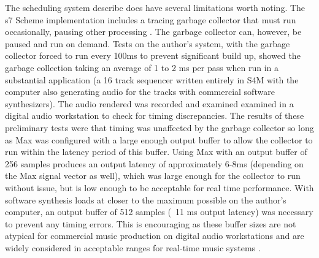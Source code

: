 \documentclass[acmsmall]{acmart}
\begin{document}
The scheduling system describe does have several limitations worth noting.
The s7 Scheme implementation includes a tracing garbage collector 
that must run occasionally, pausing other processing \cite{Matheussen2020}.
The garbage collector can, however, be paused and run on demand. Tests on the author's
system, with the garbage collector forced to run every 100ms to prevent
significant build up, showed the garbage collection taking an average of 1 to 2 ms per pass
when run in a substantial application (a 16 track sequencer written entirely in S4M
with the computer also generating audio for the tracks with commercial
software synthesizers).  
The audio rendered was recorded and examined
examined in a digital audio workstation to check for timing discrepancies. The
results of these preliminary tests were that timing was unaffected by the 
garbage collector so long as Max was configured with 
a large enough output buffer to allow the collector to run within the 
latency period of this buffer.
Using Max with an output buffer of 256 samples produces an output latency
of approximately 6-8ms (depending on the Max signal vector as well), which
was large enough for the collector to run without issue, but is 
low enough to be acceptable for real time performance. With software synthesis
loads at closer to the maximum possible on the author's computer,
an output buffer of 512 samples (~11 ms output latency) was necessary to prevent
any timing errors. This is encouraging as these buffer sizes are not atypical
for commercial music production on digital audio workstations and are widely
considered in acceptable ranges for real-time music systems \cite{Brandt1998}.
\end{document}

